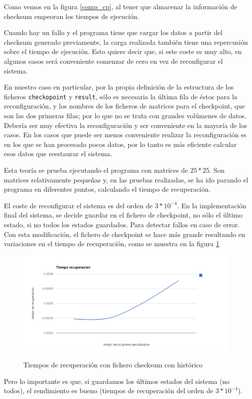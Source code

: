 \documentclass[a4paper]{article}
\begin{document}
Como vemos en la figura \ref{comp_cp}, al tener que almacenar la información de checksum empeoran los tiempos de ejecución.

Cuando hay un fallo y el programa tiene que cargar los datos a partir del checksum generado previamente, la carga realizada también tiene una repercusión sobre el tiempo de ejecución. Esto quiere decir que, si este coste es muy alto, en algunos casos será conveniente comenzar de cero en vez de reconfigurar el sistema.


En nuestro caso en particular, por la propia definición de la estructura de los ficheros \texttt{checkopoint} y \texttt{result}, sólo es necesaria la última fila de éstos para la reconfiguración, y los nombres de los ficheros de matrices para el checkpoint, que son las dos primeras filas; por lo que no se trata con grandes volúmenes de datos. Debería ser muy efectiva la reconfiguración y ser conveniente en la mayoría de los casos. En los casos que puede ser menos conveniente realizar la reconfiguración es en los que se han procesado pocos datos, por lo tanto es más eficiente calcular esos datos que reestaurar el sistema.


Esta teoría se prueba ejecutando el programa con matrices de $25*25$. Son matrices relativamente pequeñas y, en las pruebas realizadas, se ha ido parando el programa en diferentes puntos, calculando el tiempo de recuperación.


El coste de reconfigurar el sistema es del orden de $3 * 10^{-4}$.
En la implementación final del sistema, se decide guardar en el fichero de checkpoint, no sólo el último estado, si no todos los estados guardados. Para detectar fallos en caso de error. Con esta modificación, el fichero de checkpoint se hace más grande resultando en variaciones en el tiempo de recuperación, como se muestra en la figura \ref{tiempos_rec}

\begin{figure}[h!]
  \includegraphics[width=1.2\textwidth]{res/tiempos_rec}
  \label{tiempos_rec}
  \caption{Tiempos de recuperación con fichero checksum con histórico}
\end{figure}
Pero lo importante es que, si guardamos los últimos estados del sistema (no todos), el rendimiento es bueno (tiempos de recuperación del orden de $3 * 10^{-4}$).

%	
\end{document}
